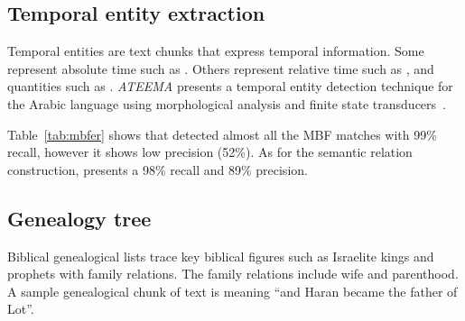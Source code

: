 \begin{table}[tb!]
  \centering
  \caption{\framework MBF and user-defined relation accuracy }
  \label{tab:mbfer}%
\end{table}%

\vspace{-1em}
\subsection{Temporal entity extraction}

Temporal entities are text chunks that express temporal information. 
Some represent absolute time such as . 
Others represent relative time such as , and quantities 
such as . 
{\em ATEEMA} presents a temporal entity detection technique for the Arabic language using 
morphological analysis and finite state transducers~\cite{ZaMa2012IJCLATime}. 

Table~\ref{tab:mbfer} shows that \framework detected almost all the MBF matches with 99\% recall, 
however it shows low precision (52\%). 
As for the semantic relation construction, \framework presents a 98\% recall and 89\% precision.

\vspace{-1em}
\subsection{Genealogy tree}

Biblical genealogical lists trace key biblical figures such as Israelite kings and
prophets with family relations. 
The family relations include wife and parenthood. 
A sample genealogical chunk of text is  
meaning ``and Haran became the father of Lot''.

